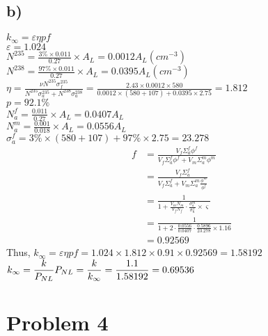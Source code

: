 \documentclass{article}
\begin{document}
\subsection*{b)}
\(k_\infty=\varepsilon \eta p f\)\\
\(\varepsilon = 1.024\)\\
\(\displaystyle N^{235}=\frac{3\%\times 0.011}{0.27}\times A_L=0.0012A_L (cm^{-3})\)\\
\(\displaystyle N^{238}=\frac{97\%\times 0.011}{0.27}\times A_L=0.0395A_L (cm^{-3})\)\\
\(\displaystyle \eta = \frac {\nu N^{235} \sigma^{235}_{f}}{N^{235}\sigma_{a}^{235}+N^{238}\sigma_{a}^{238}}
=\frac{2.43\times 0.0012\times 580}{0.0012\times (580+107)+0.0395\times 2.75}=1.812\)\\
\(p=92.1\%\)\\
\(N_a^f=\displaystyle \frac{0.011}{0.27}\times A_L=0.0407A_L\)\\
\(N_a^m=\displaystyle \frac{0.001}{0.018}\times A_L=0.0556 A_L\)\\
\(\sigma_a^f=3\%\times (580+107)+97\%\times 2.75=23.278\)\\
\begin{align*}
f&=\frac{V_f \Sigma_a^f \phi^f}{V_f \Sigma_a^f \phi^f + V_m \Sigma^m_a\phi^m}\\
&=\frac{V_f \Sigma_a^f}{V_f \Sigma_a^f+ V_m \Sigma^m_a\frac{\phi^m}{\phi^f}}\\
&=\frac{1}{1+\frac{V_mN_m}{V_fN_f}\cdot\frac{\sigma_a^m}{\sigma_a^f}\times \varsigma }\\
&=\frac{1}{1+2\cdot \frac{0.0556}{0.0407}\cdot \frac{0.5896}{23.278}\times 1.16}\\
&=0.92569
\end{align*}
Thus, \(k_\infty = \varepsilon \eta p f = 1.024\times 1.812\times 0.91\times 0.92569=1.58192\)\\
\(k_\infty=\displaystyle \frac{k}{P_{NL}}\\ P_{NL}=\frac{k}{k_\infty}=\frac{1.1}{1.58192}=0.69536\)
\section*{Problem 4}
\end{document}
